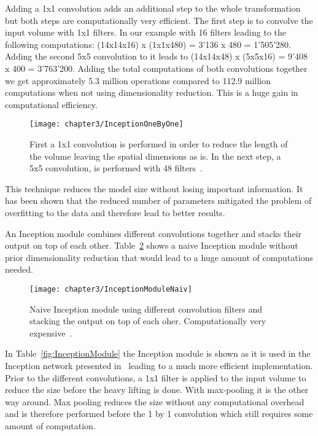 \quad

Adding a 1x1 convolution adds an additional step to the whole transformation but both steps are computationally very efficient. The first step is to convolve the input volume with 1x1 filters. In our example with 16 filters leading to the following computations: (14x14x16) x (1x1x480) = 3'136 x 480 = 1'505'280. Adding the second 5x5 convolution to it leads to (14x14x48) x (5x5x16) = 9'408 x 400 = 3'763'200. Adding the total computations of both convolutions together we get approximately 5.3 million operations compared to 112.9 million computations when not using dimensionality reduction. This is a huge gain in computational efficiency.\\


\begin{figure}[!h]
  \centering
  \caption{First a 1x1 convolution is performed in order to reduce the length of the volume leaving the spatial dimensions as is. In the next step, a 5x5 convolution, is performed with 48 filters~\cite{ReviewGoogleLeNetv1}.}
  \texttt{[image: chapter3/InceptionOneByOne]}
  \label{fig:parameters}
\end{figure}

\quad

This technique reduces the model size without losing important information. It has been shown that the reduced number of parameters mitigated the problem of overfitting to the data and therefore lead to better results. 

An Inception module combines different convolutions together and stacks their output on top of each other. Table~\ref{fig:InceptionModuleNaiv} shows a naive Inception module without prior dimensionality reduction that would lead to a huge amount of computations needed. \\


\begin{figure}[!h]
  \centering
  \caption{Naive Inception module using different convolution filters and stacking the output on top of each oher. Computationally very expensive~\cite{ReviewGoogleLeNetv1}.}
  \texttt{[image: chapter3/InceptionModuleNaiv]}
  \label{fig:InceptionModuleNaiv}
\end{figure}

\quad

In Table~\ref{fig:InceptionModule} the Inception module is shown as it is used in the Inception network presented in~\cite{szegedy2015going} leading to a much more efficient implementation. Prior to the different convolutions, a 1x1 filter is applied to the input volume to reduce the size before the heavy lifting is done. With max-pooling it is the other way around. Max pooling reduces the size without any computational overhead and is therefore performed before the 1 by 1 convolution which still requires some amount of computation.\\


